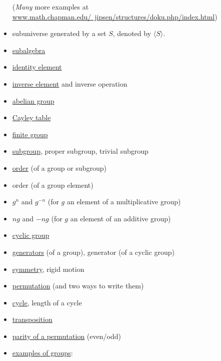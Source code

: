\documentclass[12pt]{article}
\newcommand{\defn}[1]{#1}
\newcommand\<{\ensuremath{\langle}}
\renewcommand\>{\ensuremath{\rangle}}
\begin{document}
\begin{itemize}
(\emph{Many} more examples at 
\href{http://www.math.chapman.edu/~jipsen/structures/doku.php/index.html}{www.math.chapman.edu/~jipsen/structures/doku.php/index.html})

\item \defn{subuniverse generated by a set} $S$, denoted by $\<S\>$.
\item \href{http://en.wikipedia.org/wiki/Subalgebra}{\defn{subalgebra}}
\item \href{http://en.wikipedia.org/wiki/Identity_element}{identity element}
\item \href{http://en.wikipedia.org/wiki/Inverse_element}{inverse element} and inverse operation
\item \href{http://en.wikipedia.org/wiki/Abelian_group}{abelian group}
\item \href{http://en.wikipedia.org/wiki/Cayley_table}{Cayley table}
\item \href{http://en.wikipedia.org/wiki/Finite_group}{finite group}
\item \href{http://en.wikipedia.org/wiki/Subgroup}{subgroup}, proper subgroup, trivial subgroup
\item \href{http://en.wikipedia.org/wiki/Order_(group_theory)}{order} (of a group or subgroup)
\item order (of a group element)
\item $g^n$ and $g^{-n}$ (for $g$ an element of a multiplicative group)
\item $ng$ and $-ng$ (for $g$ an element of an additive group)
\item \href{http://en.wikipedia.org/wiki/Cyclic_group}{cyclic group}
\item \href{http://en.wikipedia.org/wiki/Generating_set_of_a_group}{generators} (of a group),
generator (of a cyclic group)
\item \href{http://en.wikipedia.org/wiki/Symmetry_in_mathematics}{symmetry}, rigid motion
\item \href{http://en.wikipedia.org/wiki/Permutation}{permutation} (and two ways to write them)
\item \href{http://en.wikipedia.org/wiki/Cycle_(mathematics)}{cycle}, length of a cycle
\item \href{http://en.wikipedia.org/wiki/Cycle_(mathematics)#Transpositions}{transposition}
\item \href{http://en.wikipedia.org/wiki/Parity_of_a_permutation}{parity of a permutation} (even/odd)
\item \href{http://en.wikipedia.org/wiki/Examples_of_groups}{examples of groups}: 

\end{itemize}
\end{document}
